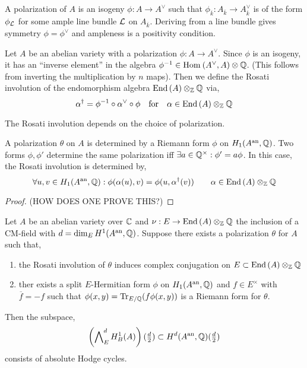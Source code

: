 \documentclass[12pt]{article}
\begin{document}
\begin{definition}
A polarization of $A$ is an isogeny $\phi : A \to A^\vee$ such that $\phi_{\overline{k}} : A_{\overline{k}} \to A_{\overline{k}}^\vee$ is of the form $\phi_{\mathcal{L}}$ for some ample line bundle $\mathcal{L}$ on $A_{\overline{k}}$. Deriving from a line bundle gives symmetry $\phi = \phi^\vee$ and ampleness is a positivity condition. 
\end{definition}

\begin{definition}
Let $A$ be an abelian variety with a polarization $\phi : A \to A^\vee$. Since $\phi$ is an isogeny, it has an ``inverse element'' in the algebra $\phi^{-1} \in \mathrm{Hom}_{} \left( A^\vee, A \right) \otimes \mathbb{Q}$. (This follows from inverting the multiplication by $n$ maps). Then we define the Rosati involution of the endomorphism algebra $\mathrm{End} \left( A \right) \otimes_{\mathbb{Z}} \mathbb{Q}$ via,
\[ \alpha^\dagger = \phi^{-1} \circ \alpha^\vee \circ \phi \quad \text{for} \quad \alpha \in \mathrm{End} \left( A \right) \otimes_{\mathbb{Z}} \mathbb{Q} \]  
\end{definition}

\begin{remark}
The Rosati involution depends on the choice of polarization. 
\end{remark}

\begin{theorem}
A polarization $\theta$ on $A$ is determined by a Riemann form $\phi$ on $H_1(A^{\mathrm{an}}, \mathbb{Q})$. Two forms $\phi, \phi'$ determine the same polarization iff $\exists a \in \mathbb{Q}^\times : \phi' = a \phi$. In this case, the Rosati involution is determined by,
\[ \forall u,v \in H_1(A^{\mathrm{an}}, \mathbb{Q}) :   \phi(\alpha(u), v) = \phi(u, \alpha^\dagger(v)) \quad \quad \alpha \in \mathrm{End} \left( A \right) \otimes_{\mathbb{Z}} \mathbb{Q} \]
\end{theorem}

\begin{proof}
(HOW DOES ONE PROVE THIS?)
\end{proof}

\begin{theorem}
Let $A$ be an abelian variety over $\mathbb{C}$ and $\nu : E \to \mathrm{End} \left( A \right) \otimes_{\mathbb{Z}} \mathbb{Q}$ the inclusion of a CM-field with $d = \dim_E H^1(A^{\mathrm{an}}, \mathbb{Q})$. Suppose there exists a polarization $\theta$ for $A$ such that,
\begin{enumerate}
\item the Rosati involution of $\theta$ induces complex conjugation on $E \subset \mathrm{End} \left( A \right) \otimes_{\mathbb{Z}} \mathbb{Q}$
\item ther exists a split $E$-Hermitian form $\phi$ on $H_1(A^{\mathrm{an}}, \mathbb{Q})$ and $f \in E^\times$ with $\overline{f} = - f$ such that $\phi(x, y) = \mathrm{Tr}_{E/\mathbb{Q}}(f\phi(x,y))$ is a Riemann form for $\theta$.
\end{enumerate}
Then the subspace,
\[ \left( \bigwedge\nolimits^d_E H^1_B(A) \right) (\tfrac{d}{2}) \subset H^d(A^{\mathrm{an}}, \mathbb{Q}) (\tfrac{d}{2}) \]
consists of absolute Hodge cycles. 
\end{theorem}
\end{document}
